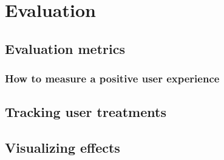 \chapter{Evaluation}

\label{Chapter5}



\section{Evaluation metrics} %
\label{sec:evaluation_metrics}

\subsection{How to measure a positive user experience} %


\section{Tracking user treatments} %
\label{sec:tracking_user_treatments}


\section{Visualizing effects} %
\label{sec:visualizing_effects}


